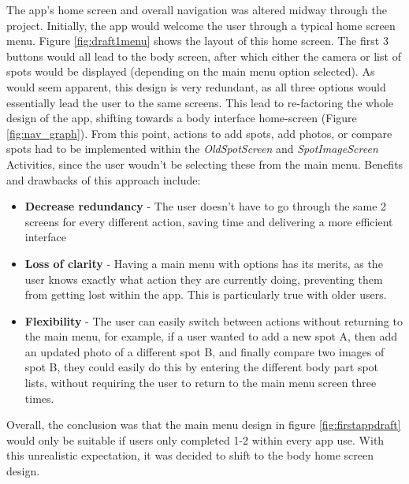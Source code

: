 The app's home screen and overall navigation was altered midway through the project. Initially, the app would welcome the user through a typical home screen menu. Figure \ref{fig:draft1menu} shows the layout of this home screen. The first 3 buttons would all lead to the body screen, after which either the camera or list of spots would be displayed (depending on the main menu option selected). As would seem apparent, this design is very redundant, as all three options would essentially lead the user to the same screens. This lead to re-factoring the whole design of the app, shifting towards a body interface home-screen (Figure \ref{fig:nav_graph}). From this point, actions to add spots, add photos, or compare spots had to be implemented within the \emph{OldSpotScreen} and \emph{SpotImageScreen} Activities, since the user woudn't be selecting these from the main menu. Benefits and drawbacks of this approach include:
\begin{itemize}
    \item \textbf{Decrease redundancy} - The user doesn't have to go through the same 2 screens for every different action, saving time and delivering a more efficient interface 
    \item \textbf{Loss of clarity} - Having a main menu with options has its merits, as the user knows exactly what action they are currently doing, preventing them from getting lost within the app. This is particularly true with older users.
    \item \textbf{Flexibility} - The user can easily switch between actions without returning to the main menu, for example, if a user wanted to add a new spot A, then  add an updated photo of a different spot B, and finally compare two images of spot B, they could easily do this by entering the different body part spot lists, without requiring the user to return to the main menu screen three times.
\end{itemize}
Overall, the conclusion was that the main menu design in figure \ref{fig:firstappdraft} would only be suitable if users only completed 1-2 within every app use. With this unrealistic expectation, it was decided to shift to the body home screen design.
\clearpage
